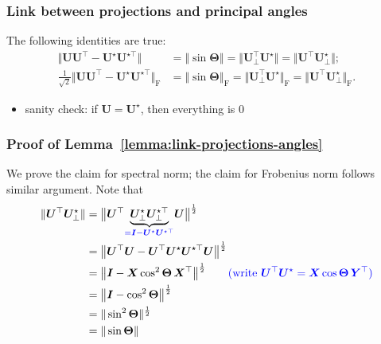 \documentclass[compress,
mathserif,wide,%
]{beamer}
\begin{document}
\begin{frame}
	\frametitle{Link between projections and principal angles}
	\begin{lemma}\label{lemma:link-projections-angles}
The following identities are true:
\begin{subequations}
\begin{align*}
	\big\Vert \bm{U}\bm{U}^{\top}-{\bm{U}}^{\star}{\bm{U}}^{\star\top}\big\Vert
	& =\left\Vert \sin\bm{\Theta}\right\Vert  = \big\Vert \bm{U}_{\perp}^{\top}\bm{U}^{\star}\big\Vert = \big\Vert \bm{U}^{\top}\bm{U}_{\perp}^{\star}\big\Vert ; \\
	\tfrac{1}{\sqrt{2}} \big\Vert \bm{U}\bm{U}^{\top}-{\bm{U}}^{\star}{\bm{U}}^{\star\top}\big\Vert _{\mathrm{F}}
	& =\left\Vert \sin\bm{\Theta}\right\Vert _{\mathrm{F}}
	=  \big\Vert \bm{U}_{\perp}^{\top}\bm{U}^{\star}\big\Vert_{\mathrm{F}} =   \big\Vert \bm{U}^{\top}\bm{U}_{\perp}^{\star} \big\Vert_{\mathrm{F}} .
\end{align*}
\end{subequations}
\end{lemma}

\vfill 
\begin{itemize}
	\item sanity check: if $\bm{U} = \bm{U}^\star$, then  everything is 0
\end{itemize}
%
\end{frame}





\begin{frame}
\frametitle{Proof of Lemma~\ref{lemma:link-projections-angles}}

We prove the claim for spectral norm; the claim for Frobenius norm follows similar argument. Note that
\begin{align*}
\|\bm{U}^{\top}\bm{U}^\star_{\perp}\| & = \big\| \bm{U}^{\top}\underset{\textcolor{blue}{ =\bm{I}-\bm{U}^\star\bm{U}^{\star\top}}}{\underbrace{\bm{U}^\star_{\perp}\bm{U}^{\star\top}_{\perp}}}\bm{U} \big\|^{\frac{1}{2}}\\
 & = \big\| \bm{U}^{\top}\bm{U}-\bm{U}^{\top}\bm{U}^\star\bm{U}^{\star\top}\bm{U} \big \|^{\frac{1}{2}}\\
 & = \big\| \bm{I}-\bm{X}\cos^{2}\bm{\Theta} \,\bm{X}^{\top} \big\|^{\frac{1}{2}}\qquad \textcolor{blue}{ (\text{write }\bm{U}^{\top}\bm{U}^\star=\bm{X}\cos\bm{\Theta}\,\bm{Y}^{\top})}\\
 & = \big\|\bm{I}-\cos^{2}\bm{\Theta} \big\|^{\frac{1}{2}} \\
 & = \|\sin^{2}\bm{\Theta}\|^{\frac{1}{2}} \\
 & =\|\sin\bm{\Theta}\|
\end{align*}

\end{frame}
\end{document}
